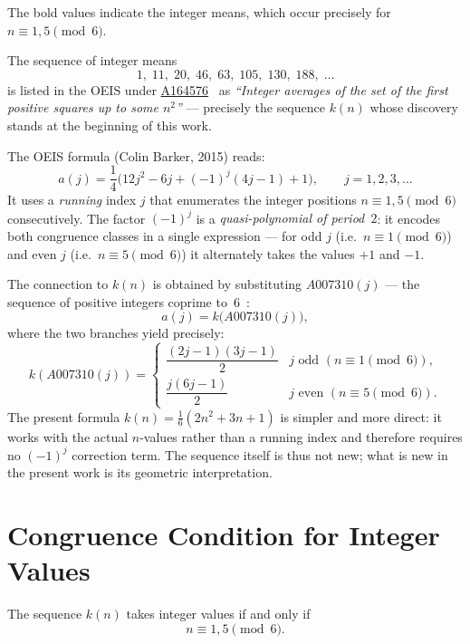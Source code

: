 The bold values indicate the integer means, which occur precisely for
$n \equiv 1, 5 \pmod{6}$.

\begin{remark}
	The sequence of integer means
	\[
	1,\; 11,\; 20,\; 46,\; 63,\; 105,\; 130,\; 188,\;\ldots
	\]
	is listed in the OEIS under \href{https://oeis.org/A164576}{A164576}~\cite{OEIS}
	as \emph{``Integer averages of the set of the first positive
		squares up to some $n^2$''} --- precisely the sequence $k(n)$ whose
	discovery stands at the beginning of this work.
	
	The OEIS formula (Colin Barker, 2015) reads:
	\[
	a(j) = \frac{1}{4}\bigl(12j^2 - 6j + (-1)^j(4j-1) + 1\bigr),
	\qquad j = 1, 2, 3, \ldots
	\]
	It uses a \emph{running} index $j$ that enumerates the integer
	positions $n \equiv 1, 5 \pmod{6}$ consecutively.
	The factor $(-1)^j$ is a \emph{quasi-polynomial of period~$2$}:
	it encodes both congruence classes in a single expression --- for
	odd $j$ (i.e.\ $n \equiv 1 \pmod{6}$) and even $j$
	(i.e.\ $n \equiv 5 \pmod{6}$) it alternately takes the values
	$+1$ and $-1$.
	
	The connection to $k(n)$ is obtained by substituting
	$A007310(j)$ --- the sequence of positive integers coprime
	to~$6$~\cite{OEIS}:
	\[
	a(j) = k\!\bigl(A007310(j)\bigr),
	\]
	where the two branches yield precisely:
	\[
	k(A007310(j)) =
	\begin{cases}
		\dfrac{(2j-1)(3j-1)}{2} & j \text{ odd } (n \equiv 1 \pmod{6}), \\[8pt]
		\dfrac{j(6j-1)}{2}      & j \text{ even }   (n \equiv 5 \pmod{6}).
	\end{cases}
	\]
	The present formula $k(n) = \tfrac{1}{6}(2n^2+3n+1)$
	is simpler and more direct: it works with the actual
	$n$-values rather than a running index and therefore requires
	no $(-1)^j$ correction term.
The sequence itself is thus not new; what is new in the present
work is its geometric interpretation.
\end{remark}

\clearpage

\section{Congruence Condition for Integer Values}

\begin{theorem}\label{satz:kongruenz}
The sequence $k(n)$ takes integer values if and only if
\begin{equation}
n \equiv 1, 5 \pmod{6}.
\end{equation}
\end{theorem}

